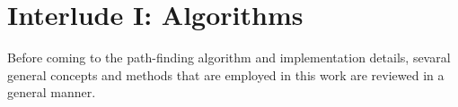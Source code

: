 %
%

\chapter{Interlude I: Algorithms}
\label{ch:algos}

Before coming to the path-finding algorithm and implementation details, 
sevaral general concepts and methods that are employed in this work are reviewed 
in a general manner.

